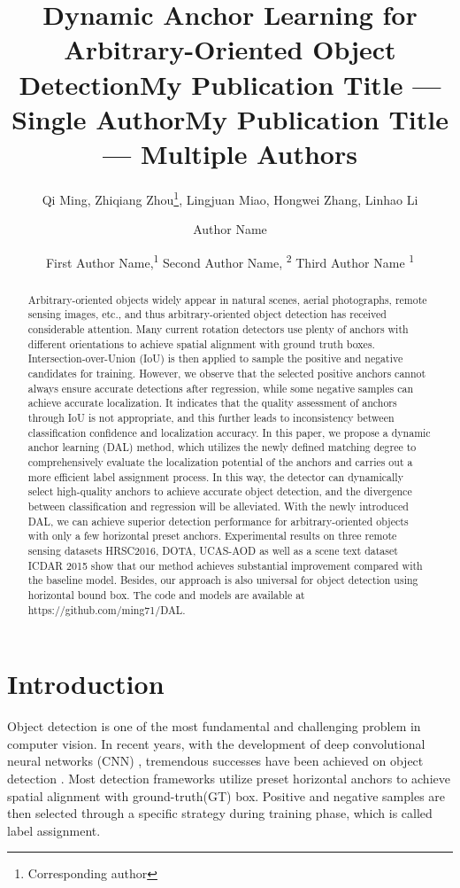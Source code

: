 \documentclass[letterpaper]{article} \usepackage{aaai21}  \usepackage{times}  \usepackage{helvet} \usepackage{courier}  \usepackage[hyphens]{url}  \usepackage{graphicx} \urlstyle{rm} \def\UrlFont{\rm}  \usepackage{natbib}  \usepackage{caption} \frenchspacing  \setlength{\pdfpagewidth}{8.5in}  \setlength{\pdfpageheight}{11in}  \usepackage{url}
\title{Dynamic Anchor Learning for Arbitrary-Oriented Object Detection}
\author{
Qi Ming, Zhiqiang Zhou\thanks{Corresponding author}, Lingjuan Miao, Hongwei Zhang, Linhao Li
\\
}
\title{My Publication Title --- Single Author}
\author {
Author Name \\
}
\title{My Publication Title --- Multiple Authors}
\author {


        First Author Name,\textsuperscript{\rm 1}
        Second Author Name, \textsuperscript{\rm 2}
        Third Author Name \textsuperscript{\rm 1} \\
}
\begin{document}
\maketitle

\begin{abstract}

Arbitrary-oriented objects widely appear in natural scenes, aerial photographs, remote sensing images, etc., and thus arbitrary-oriented object detection has received considerable attention. Many current rotation detectors use plenty of anchors with different orientations to achieve spatial alignment with ground truth boxes. Intersection-over-Union (IoU) is then applied to sample the positive and negative candidates for training. However, we observe that the selected positive anchors cannot always ensure accurate detections after regression, while some negative samples can achieve accurate localization. It indicates that the quality assessment of anchors through IoU is not appropriate, and this further leads to inconsistency between classification confidence and localization accuracy. In this paper, we propose a dynamic anchor learning (DAL) method, which utilizes the newly defined matching degree to comprehensively evaluate the localization potential of the anchors and carries out a more efficient label assignment process. In this way, the detector can dynamically select high-quality anchors to achieve accurate object detection, and the divergence between classification and regression will be alleviated. With the newly introduced DAL, we can achieve superior detection performance for arbitrary-oriented objects with only a few horizontal preset anchors. Experimental results on three remote sensing datasets HRSC2016, DOTA, UCAS-AOD as well as a scene text dataset ICDAR 2015 show that our method achieves substantial improvement compared with the baseline model. Besides, our approach is also universal for object detection using horizontal bound box. The code and models are available at https://github.com/ming71/DAL.
\end{abstract}

\section{Introduction}

Object detection is one of the most fundamental and challenging problem in computer vision. In recent years, with the development of deep convolutional neural networks (CNN) , tremendous successes have been achieved on object detection \cite{ren2015faster, dai2016r, redmon2016you, liu2016ssd}. Most detection frameworks utilize preset horizontal anchors to achieve spatial alignment with ground-truth(GT) box. Positive and negative samples are then selected through a specific strategy during training phase, which is called label assignment. 
\end{document}
